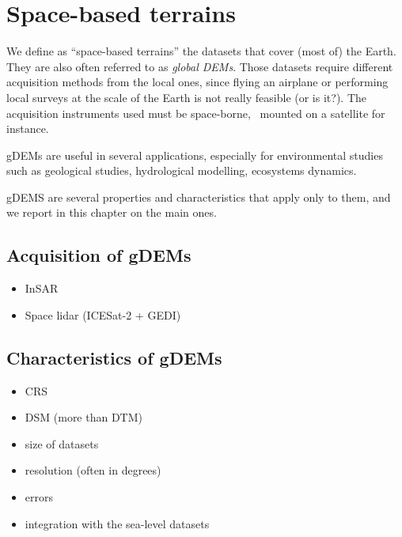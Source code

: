 
\setchapterpreamble[u]{\margintoc}
\graphicspath{{spacedem/}}


\chapter{Space-based terrains}%
\label{chap:spacedem}

We define as ``space-based terrains'' the datasets that cover (most of) the Earth.
They are also often referred to as \emph{global DEMs}.
Those datasets require different acquisition methods from the local ones, since flying an airplane or performing local surveys at the scale of the Earth is not really feasible (or is it?).
The acquisition instruments used must be space-borne, \ie\ mounted on a satellite for instance.


gDEMs are useful in several applications, especially for environmental studies such as geological studies, hydrological modelling, ecosystems dynamics.

gDEMS are several properties and characteristics that apply only to them, and we report in this chapter on the main ones.


%
\section{Acquisition of gDEMs}

\begin{itemize}
  \item InSAR
  \item Space lidar (ICESat-2 + GEDI)
\end{itemize}


%
\section{Characteristics of gDEMs}

\begin{itemize}
  \item CRS
  \item DSM (more than DTM)
  \item size of datasets
  \item resolution (often in degrees)
  \item errors
  \item integration with the sea-level datasets
\end{itemize}


